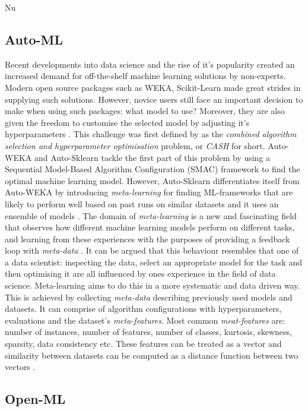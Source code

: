 Nu\documentclass[11pt,twoside, a4paper]{report}
\begin{document}
\subsection{Auto-ML}
Recent developments into data science and the rise of it's popularity created an increased demand for off-the-shelf machine learning solutions by non-experts. Modern open source packages such as WEKA, Scikit-Learn made great strides in supplying such solutions. However, novice users still face an important decision to make when using such packages: what model to use? Moreover, they are also given the freedom to customise the selected model by adjusting it's hyperparameters \cite{Kotthoff2017}. This challenge was first defined by \citeauthor{Kotthoff2017} as the \emph{combined algorithm selection and hyperparameter optimisation} problem, or \emph{CASH} for short. Auto-WEKA and Auto-Sklearn tackle the first part of this problem by using a Sequential Model-Based Algorithm Configuration (SMAC) \cite{Hutter2011} framework to find the optimal machine learning model.  However, Auto-Sklearn differentiates itself from Auto-WEKA by introducing \emph{meta-learning} for finding ML-frameworks that are likely to perform well based on past runs on similar datasets and it uses an ensemble of models \cite{Feurer2015}. 
The domain of \emph{meta-learning} is a new and fascinating field that observes how different machine learning models perform on different tasks, and learning from these experiences with the purposes of providing a feedback loop with \emph{meta-data} \parencite{Vanschoren}. It can be argued that this behaviour resembles that one of a data scientist: inspecting the data, select an appropriate model for the task and then optimising it are all influenced by ones experience in the field of data science. Meta-learning aims to do this in a more systematic and data driven way. This is achieved by collecting \emph{meta-data} describing previously used models and datasets. It can comprise of algorithm configurations with hyperparameters, evaluations and the dataset's \emph{meta-features}. Most common \emph{meat-features} are: number of instances, number of features, number of classes, kurtosis, skewness, sparsity, data consistency etc. These features can be treated as a vector and similarity between datasets can be computed as a distance function between two vectors \parencite{Vanschoren}. 

\subsection{Open-ML}
\end{document}
